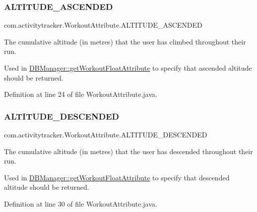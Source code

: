 \subsubsection{\texorpdfstring{A\+L\+T\+I\+T\+U\+D\+E\+\_\+\+A\+S\+C\+E\+N\+D\+ED}{ALTITUDE\_ASCENDED}}
{\footnotesize\ttfamily com.\+activitytracker.\+Workout\+Attribute.\+A\+L\+T\+I\+T\+U\+D\+E\+\_\+\+A\+S\+C\+E\+N\+D\+ED}

The cumulative altitude (in metres) that the user has climbed throughout their run.

Used in \mbox{\hyperlink{classcom_1_1activitytracker_1_1_d_b_manager_a6bda377e79678d0e898c4240d24eb391}{D\+B\+Manager\+::get\+Workout\+Float\+Attribute}} to specify that ascended altitude should be returned. 

Definition at line 24 of file Workout\+Attribute.\+java.

\mbox{\label{enumcom_1_1activitytracker_1_1_workout_attribute_a1aec2c32feb3bab1e6501d3b80079b88}} 
\subsubsection{\texorpdfstring{A\+L\+T\+I\+T\+U\+D\+E\+\_\+\+D\+E\+S\+C\+E\+N\+D\+ED}{ALTITUDE\_DESCENDED}}
{\footnotesize\ttfamily com.\+activitytracker.\+Workout\+Attribute.\+A\+L\+T\+I\+T\+U\+D\+E\+\_\+\+D\+E\+S\+C\+E\+N\+D\+ED}

The cumulative altitude (in metres) that the user has descended throughout their run.

Used in \mbox{\hyperlink{classcom_1_1activitytracker_1_1_d_b_manager_a6bda377e79678d0e898c4240d24eb391}{D\+B\+Manager\+::get\+Workout\+Float\+Attribute}} to specify that descended altitude should be returned. 

Definition at line 30 of file Workout\+Attribute.\+java.

\mbox{\label{enumcom_1_1activitytracker_1_1_workout_attribute_a9df78b53c3bb12809b5f6eff60b88c71}} 
